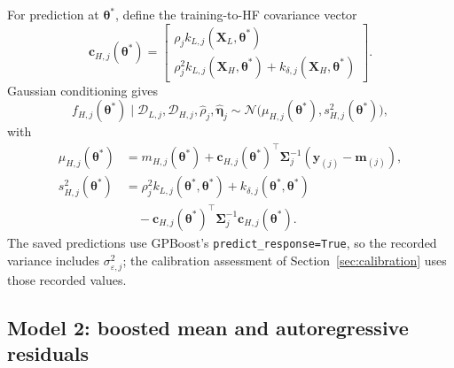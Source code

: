 \documentclass[12pt, letterpaper, oneside]{article}
\begin{document}
For prediction at $\bm\theta^*$, define the training-to-HF covariance vector
\begin{equation}
    \mathbf{c}_{H,j}(\bm\theta^*)
    = \begin{bmatrix}
        \rho_j k_{L,j}(\mathbf{X}_L,\bm\theta^*) \\
        \rho_j^2 k_{L,j}(\mathbf{X}_H,\bm\theta^*)
          + k_{\delta,j}(\mathbf{X}_H,\bm\theta^*)
      \end{bmatrix}.
    \label{eq:model1-cross}
\end{equation}
Gaussian conditioning gives
\begin{equation}
    f_{H,j}(\bm\theta^*)\mid
    \mathcal{D}_{L,j},\mathcal{D}_{H,j},
    \widehat\rho_j,\widehat{\bm\eta}_j
    \sim\mathcal{N}\bigl(
        \mu_{H,j}(\bm\theta^*),s^2_{H,j}(\bm\theta^*)\bigr),
    \label{eq:model1-pred}
\end{equation}
with
\begin{align}
    \mu_{H,j}(\bm\theta^*)
    &= m_{H,j}(\bm\theta^*)+\mathbf{c}_{H,j}(\bm\theta^*)^\top
       \bm\Sigma_j^{-1}(\mathbf{y}_{(j)}-\mathbf m_{(j)}),
       \label{eq:model1-mean} \\
    s^2_{H,j}(\bm\theta^*)
    &= \rho_j^2 k_{L,j}(\bm\theta^*,\bm\theta^*)
       + k_{\delta,j}(\bm\theta^*,\bm\theta^*) \nonumber\\
    &\quad - \mathbf{c}_{H,j}(\bm\theta^*)^\top
       \bm\Sigma_j^{-1}\mathbf{c}_{H,j}(\bm\theta^*).
       \label{eq:model1-var}
\end{align}
The saved predictions use GPBoost's \texttt{predict\_response=True}, so the
recorded variance includes $\sigma^2_{\varepsilon,j}$; the calibration
assessment of Section~\ref{sec:calibration} uses those recorded values.

\subsection{Model 2: boosted mean and autoregressive residuals}
\label{subsec:model2}
\end{document}
